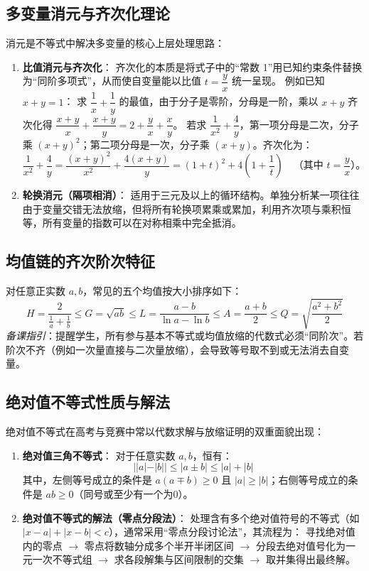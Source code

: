 \documentclass[11pt,a4paper]{ctexart}
\begin{document}
\subsection{多变量消元与齐次化理论}
消元是不等式中解决多变量的核心上层处理思路：

\begin{enumerate}[label=\arabic*. , leftmargin=2em, itemsep=1.2em, topsep=0.2em]
  \item \textbf{比值消元与齐次化}：
  齐次化的本质是将式子中的“常数 1”用已知约束条件替换为“同阶多项式”，从而使自变量能以比值 \(t = \dfrac{y}{x}\) 统一呈现。
  例如已知 \(x+y=1\)：
  求 \(\dfrac{1}{x} + \dfrac{1}{y}\) 的最值，由于分子是零阶，分母是一阶，乘以 \(x+y\) 齐次化得 \(\dfrac{x+y}{x} + \dfrac{x+y}{y} = 2 + \dfrac{y}{x} + \dfrac{x}{y}\)。
  若求 \(\dfrac{1}{x^2} + \dfrac{4}{y}\)，第一项分母是二次，分子乘 \((x+y)^2\)；第二项分母是一次，分子乘 \((x+y)\)。齐次化为：
  \[
  \frac{1}{x^2} + \frac{4}{y} = \frac{(x+y)^2}{x^2} + \frac{4(x+y)}{y} = (1+t)^2 + 4\left(1+\frac{1}{t}\right) \quad \text{（其中 } t = \frac{y}{x}\text{）。}
  \]
  
  \item \textbf{轮换消元（隔项相消）}：
  适用于三元及以上的循环结构。单独分析某一项往往由于变量交错无法放缩，但将所有轮换项累乘或累加，利用齐次项与乘积恒等，所有变量的指数可以在对称相乘中完全抵消。
\end{enumerate}

\subsection{均值链的齐次阶次特征}
对任意正实数 \(a, b\)，常见的五个均值按大小排序如下：
\[
H = \frac{2}{\frac{1}{a} + \frac{1}{b}} \leqslant G = \sqrt{ab} \leqslant L = \frac{a - b}{\ln a - \ln b} \leqslant A = \frac{a + b}{2} \leqslant Q = \sqrt{\frac{a^2 + b^2}{2}}
\]
\textit{备课指引}：提醒学生，所有参与基本不等式或均值放缩的代数式必须“同阶次”。若阶次不齐（例如一次量直接与二次量放缩），会导致等号取不到或无法消去自变量。

\subsection{绝对值不等式性质与解法}
绝对值不等式在高考与竞赛中常以代数求解与放缩证明的双重面貌出现：

\begin{enumerate}[label=\arabic*. , leftmargin=2em, itemsep=1.2em, topsep=0.2em]
  \item \textbf{绝对值三角不等式}：
  对于任意实数 \(a, b\)，恒有：
  \[
  ||a| - |b|| \leqslant |a \pm b| \leqslant |a| + |b|
  \]
  其中，左侧等号成立的条件是 \(a(a \mp b) \geqslant 0\) 且 \(|a| \geqslant |b|\)；右侧等号成立的条件是 \(ab \geqslant 0\)（同号或至少有一个为0）。
  
  \item \textbf{绝对值不等式的解法（零点分段法）}：
  处理含有多个绝对值符号的不等式（如 \(|x-a| + |x-b| < c\)），通常采用“零点分段讨论法”，其流程为：
  寻找绝对值内的零点 \(\to\) 零点将数轴分成多个半开半闭区间 \(\to\) 分段去绝对值号化为一元一次不等式组 \(\to\) 求各段解集与区间限制的交集 \(\to\) 取并集得出最终解。
\end{enumerate}
\end{document}
